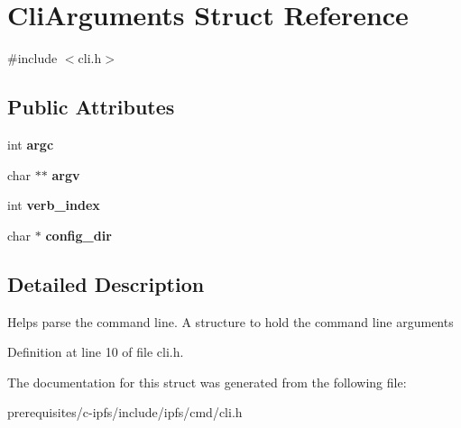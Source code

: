 \hypertarget{struct_cli_arguments}{}\section{Cli\+Arguments Struct Reference}
\label{struct_cli_arguments}


{\ttfamily \#include $<$cli.\+h$>$}

\subsection*{Public Attributes}
\begin{DoxyCompactItemize}
\item 
\mbox{\label{struct_cli_arguments_af48bfe963f16dd33394149eecc581e4a}} 
int {\bfseries argc}
\item 
\mbox{\label{struct_cli_arguments_ac7220c52bbe2abb37ce0cb6b0cd5c38f}} 
char $\ast$$\ast$ {\bfseries argv}
\item 
\mbox{\label{struct_cli_arguments_a1758d28dd3f2a60221d7b802c70ddf95}} 
int {\bfseries verb\+\_\+index}
\item 
\mbox{\label{struct_cli_arguments_ace24a0c80ac156553792093dbc2a5549}} 
char $\ast$ {\bfseries config\+\_\+dir}
\end{DoxyCompactItemize}


\subsection{Detailed Description}
Helps parse the command line. A structure to hold the command line arguments 

Definition at line 10 of file cli.\+h.



The documentation for this struct was generated from the following file\+:\begin{DoxyCompactItemize}
\item 
prerequisites/c-\/ipfs/include/ipfs/cmd/cli.\+h\end{DoxyCompactItemize}
